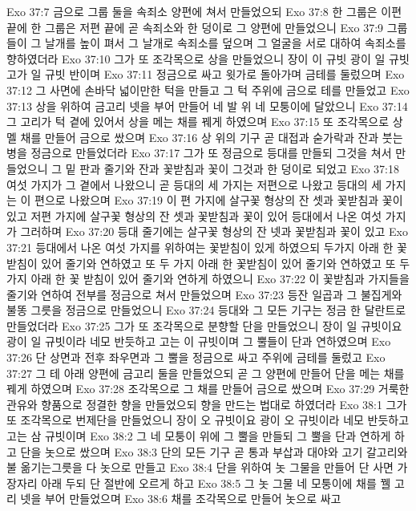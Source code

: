 Exo 37:7  금으로 그룹 둘을 속죄소 양편에 쳐서 만들었으되
Exo 37:8  한 그룹은 이편 끝에 한 그룹은 저편 끝에 곧 속죄소와 한 덩이로 그 양편에 만들었으니
Exo 37:9  그룹들이 그 날개를 높이 펴서 그 날개로 속죄소를 덮으며 그 얼굴을 서로 대하여 속죄소를 향하였더라
Exo 37:10  그가 또 조각목으로 상을 만들었으니 장이 이 규빗 광이 일 규빗고가 일 규빗 반이며
Exo 37:11  정금으로 싸고 윗가로 돌아가며 금테를 둘렀으며
Exo 37:12  그 사면에 손바닥 넓이만한 턱을 만들고 그 턱 주위에 금으로 테를 만들었고
Exo 37:13  상을 위하여 금고리 넷을 부어 만들어 네 발 위 네 모퉁이에 달았으니
Exo 37:14  그 고리가 턱 곁에 있어서 상을 메는 채를 꿰게 하였으며
Exo 37:15  또 조각목으로 상 멜 채를 만들어 금으로 쌌으며
Exo 37:16  상 위의 기구 곧 대접과 숟가락과 잔과 붓는 병을 정금으로 만들었더라
Exo 37:17  그가 또 정금으로 등대를 만들되 그것을 쳐서 만들었으니 그 밑 판과 줄기와 잔과 꽃받침과 꽃이 그것과 한 덩이로 되었고
Exo 37:18  여섯 가지가 그 곁에서 나왔으니 곧 등대의 세 가지는 저편으로 나왔고 등대의 세 가지는 이 편으로 나왔으며
Exo 37:19  이 편 가지에 살구꽃 형상의 잔 셋과 꽃받침과 꽃이 있고 저편 가지에 살구꽃 형상의 잔 셋과 꽃받침과 꽃이 있어 등대에서 나온 여섯 가지가 그러하며
Exo 37:20  등대 줄기에는 살구꽃 형상의 잔 넷과 꽃받침과 꽃이 있고
Exo 37:21  등대에서 나온 여섯 가지를 위하여는 꽃받침이 있게 하였으되 두가지 아래 한 꽃받침이 있어 줄기와 연하였고 또 두 가지 아래 한 꽃받침이 있어 줄기와 연하였고 또 두가지 아래 한 꽃 받침이 있어 줄기와 연하게 하였으니
Exo 37:22  이 꽃받침과 가지들을 줄기와 연하여 전부를 정금으로 쳐서 만들었으며
Exo 37:23  등잔 일곱과 그 불집게와 불똥 그릇을 정금으로 만들었으니
Exo 37:24  등대와 그 모든 기구는 정금 한 달란트로 만들었더라
Exo 37:25  그가 또 조각목으로 분향할 단을 만들었으니 장이 일 규빗이요 광이 일 규빗이라 네모 반듯하고 고는 이 규빗이며 그 뿔들이 단과 연하였으며
Exo 37:26  단 상면과 전후 좌우면과 그 뿔을 정금으로 싸고 주위에 금테를 둘렀고
Exo 37:27  그 테 아래 양편에 금고리 둘을 만들었으되 곧 그 양편에 만들어 단을 메는 채를 꿰게 하였으며
Exo 37:28  조각목으로 그 채를 만들어 금으로 쌌으며
Exo 37:29  거룩한 관유와 향품으로 정결한 향을 만들었으되 향을 만드는 법대로 하였더라
Exo 38:1  그가 또 조각목으로 번제단을 만들었으니 장이 오 규빗이요 광이 오 규빗이라 네모 반듯하고 고는 삼 규빗이며
Exo 38:2  그 네 모퉁이 위에 그 뿔을 만들되 그 뿔을 단과 연하게 하고 단을 놋으로 쌌으며
Exo 38:3  단의 모든 기구 곧 통과 부삽과 대야와 고기 갈고리와 불 옮기는그릇을 다 놋으로 만들고
Exo 38:4  단을 위하여 놋 그물을 만들어 단 사면 가장자리 아래 두되 단 절반에 오르게 하고
Exo 38:5  그 놋 그물 네 모퉁이에 채를 꿸 고리 넷을 부어 만들었으며
Exo 38:6  채를 조각목으로 만들어 놋으로 싸고
